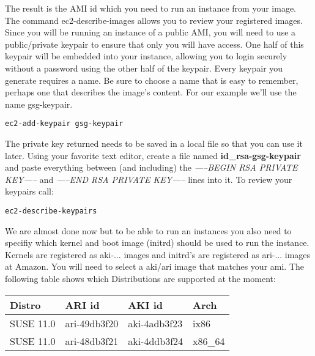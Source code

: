The result is the AMI id which you need to run an instance from
your image. The command ec2-describe-images allows you to review your
registered images. Since you will be running an instance of a public AMI,
you will need to use a public/private keypair to ensure that only you
will have access. One half of this keypair will be embedded into your
instance, allowing you to login securely without a password using the
other half of the keypair. Every keypair you generate requires a name.
Be sure to choose a name that is easy to remember, perhaps one that
describes the image's content. For our example we'll use the name
gsg-keypair.

\begin{Command}{10cm}
\begin{verbatim}
ec2-add-keypair gsg-keypair
\end{verbatim}
\end{Command}

The private key returned needs to be saved in a local file so that
you can use it later. Using your favorite text editor, create a file
named \textbf{id\_rsa-gsg-keypair} and paste everything between
(and including) the \textit{-----BEGIN RSA PRIVATE KEY-----} and
\textit{-----END RSA PRIVATE KEY-----} lines into it. To review
your keypairs call:

\begin{Command}{10cm}
\begin{verbatim}
ec2-describe-keypairs
\end{verbatim}
\end{Command}

We are almost done now but to be able to run an instances you also need
to specifiy which kernel and boot image (initrd) should be used to run
the instance. Kernels are registered as aki-... images and initrd's
are registered as ari-... images at Amazon. You will need to select a
aki/ari image that matches your ami. The following table shows which
Distributions are supported at the moment:\\

\begin{tabular}[h]{|p{2cm}|p{2.6cm}|p{2.6cm}|p{2cm}|}
\hline
\textbf{Distro} & \textbf{ARI id} & \textbf{AKI id} & \textbf{Arch} \\
\hline
SUSE 11.0 & ari-49db3f20 & aki-4adb3f23 & ix86    \\
SUSE 11.0 & ari-48db3f21 & aki-4ddb3f24 & x86\_64 \\
\hline
\end{tabular}\\


